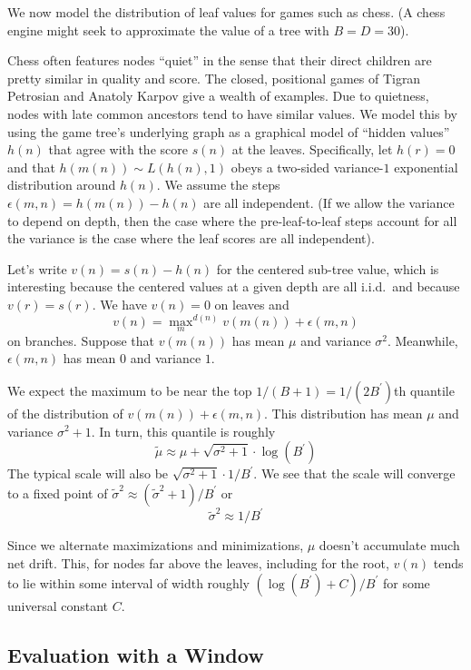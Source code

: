 \documentclass[12pt]{article}
\begin{document}
      We now model the distribution of leaf values for games such as chess.
      (A chess engine might seek to approximate the value of a tree with $B=D=30$). 

      Chess often features nodes ``quiet'' in the sense that their direct
      children are pretty similar in quality and score.  The closed, positional
      games of Tigran Petrosian and Anatoly Karpov give a wealth of examples.
      Due to quietness, nodes with late common ancestors tend to have similar
      values.  We model this by using the game tree's underlying graph as 
      a graphical model of ``hidden values'' $h(n)$ that agree with the
      score $s(n)$ at the leaves.
      Specifically, let $h(r)=0$ and that $h(m(n)) \sim L(h(n), 1)$ obeys a
      two-sided variance-$1$ exponential distribution around $h(n)$.  We assume
      the steps $\epsilon(m,n)=h(m(n))-h(n)$ are all independent. 
      (If we allow the variance to depend on depth, then the case where the
      pre-leaf-to-leaf steps account for all the variance is the case where the
      leaf scores are all independent).

      Let's write $v(n) = s(n)-h(n)$ for the centered sub-tree value, which is
      interesting because the centered values at a given depth are all
      i.i.d.\ and because $v(r)=s(r)$.  We have $v(n)=0$ on leaves and
      $$
          v(n) = {\max_m}^{d(n)} v(m(n)) + \epsilon(m,n)
      $$
      on branches.
      Suppose that $v(m(n))$ has mean $\mu$ and variance $\sigma^2$. 
      Meanwhile, $\epsilon(m,n)$ has mean $0$ and variance $1$.

      We expect the maximum to be near the top $1/(B+1)=1/(2B^\prime)$th quantile
      of the distribution of $v(m(n))+\epsilon(m,n)$.  This distribution has
      mean $\mu$ and variance $\sigma^2+1$.  In turn, this quantile is roughly
      $$
          \tilde \mu \approx \mu + \sqrt{\sigma^2+1} \cdot \log(B^\prime)
      $$
      The typical scale will also be
      $\sqrt{\sigma^2+1} \cdot 1/B^\prime$.
      We see that the scale will converge to a fixed point of
      $
          \tilde \sigma^2 \approx (\tilde \sigma^2 + 1) / B^\prime
      $
      or
      $$
          \tilde \sigma^2 \approx 1/B^\prime
      $$

      Since we alternate maximizations and minimizations, $\mu$ doesn't
      accumulate much net drift.  This, for nodes far above the leaves,
      including for the root, $v(n)$ tends to lie within some interval of width
      roughly $(\log(B^\prime)+C) / B^\prime$ for some universal
      constant $C$. 

    \subsection{Evaluation with a Window}
\end{document}
